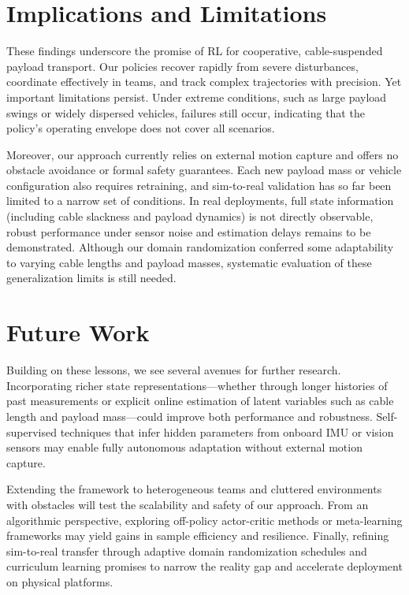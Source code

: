 \section{Implications and Limitations}

These findings underscore the promise of RL for cooperative, cable-suspended payload transport.  Our policies recover rapidly from severe disturbances, coordinate effectively in teams, and track complex trajectories with precision.  Yet important limitations persist.  Under extreme conditions, such as large payload swings or widely dispersed vehicles, failures still occur, indicating that the policy's operating envelope does not cover all scenarios.

Moreover, our approach currently relies on external motion capture and offers no obstacle avoidance or formal safety guarantees.  Each new payload mass or vehicle configuration also requires retraining, and sim-to-real validation has so far been limited to a narrow set of conditions.   In real deployments, full state information (including cable slackness and payload dynamics) is not directly observable, robust performance under sensor noise and estimation delays remains to be demonstrated.  Although our domain randomization conferred some adaptability to varying cable lengths and payload masses, systematic evaluation of these generalization limits is still needed.
\section{Future Work}

Building on these lessons, we see several avenues for further research.  Incorporating richer state representations—whether through longer histories of past measurements or explicit online estimation of latent variables such as cable length and payload mass—could improve both performance and robustness.  Self-supervised techniques that infer hidden parameters from onboard IMU or vision sensors may enable fully autonomous adaptation without external motion capture.

Extending the framework to heterogeneous teams and cluttered environments with obstacles will test the scalability and safety of our approach.  From an algorithmic perspective, exploring off-policy actor-critic methods or meta-learning frameworks may yield gains in sample efficiency and resilience.  Finally, refining sim-to-real transfer through adaptive domain randomization schedules and curriculum learning promises to narrow the reality gap and accelerate deployment on physical platforms.


